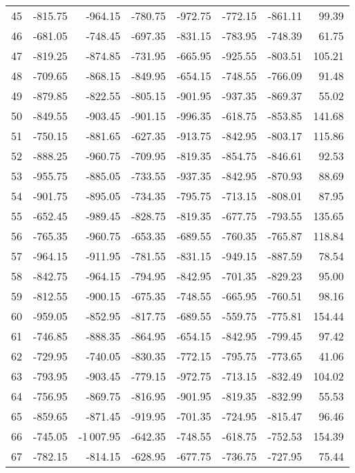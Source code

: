 \begin{longtable}{rrrrrrrr}
45 & -815.75 & -964.15 & -780.75 & -972.75 & -772.15 & -861.11 & 99.39  \\
46 & -681.05 & -748.45 & -697.35 & -831.15 & -783.95 & -748.39 & 61.75  \\
47 & -819.25 & -874.85 & -731.95 & -665.95 & -925.55 & -803.51 & 105.21  \\
48 & -709.65 & -868.15 & -849.95 & -654.15 & -748.55 & -766.09 & 91.48  \\
49 & -879.85 & -822.55 & -805.15 & -901.95 & -937.35 & -869.37 & 55.02  \\
50 & -849.55 & -903.45 & -901.15 & -996.35 & -618.75 & -853.85 & 141.68  \\
51 & -750.15 & -881.65 & -627.35 & -913.75 & -842.95 & -803.17 & 115.86  \\
52 & -888.25 & -960.75 & -709.95 & -819.35 & -854.75 & -846.61 & 92.53  \\
53 & -955.75 & -885.05 & -733.55 & -937.35 & -842.95 & -870.93 & 88.69  \\
54 & -901.75 & -895.05 & -734.35 & -795.75 & -713.15 & -808.01 & 87.95  \\
55 & -652.45 & -989.45 & -828.75 & -819.35 & -677.75 & -793.55 & 135.65  \\
56 & -765.35 & -960.75 & -653.35 & -689.55 & -760.35 & -765.87 & 118.84  \\
57 & -964.15 & -911.95 & -781.55 & -831.15 & -949.15 & -887.59 & 78.54  \\
58 & -842.75 & -964.15 & -794.95 & -842.95 & -701.35 & -829.23 & 95.00  \\
59 & -812.55 & -900.15 & -675.35 & -748.55 & -665.95 & -760.51 & 98.16  \\
60 & -959.05 & -852.95 & -817.75 & -689.55 & -559.75 & -775.81 & 154.44  \\
61 & -746.85 & -888.35 & -864.95 & -654.15 & -842.95 & -799.45 & 97.42  \\
62 & -729.95 & -740.05 & -830.35 & -772.15 & -795.75 & -773.65 & 41.06  \\
63 & -793.95 & -903.45 & -779.15 & -972.75 & -713.15 & -832.49 & 104.02  \\
64 & -756.95 & -869.75 & -816.95 & -901.95 & -819.35 & -832.99 & 55.53  \\
65 & -859.65 & -871.45 & -919.95 & -701.35 & -724.95 & -815.47 & 96.46  \\
66 & -745.05 & -1\,007.95 & -642.35 & -748.55 & -618.75 & -752.53 & 154.39  \\
67 & -782.15 & -814.15 & -628.95 & -677.75 & -736.75 & -727.95 & 75.44  \\

\end{longtable}
